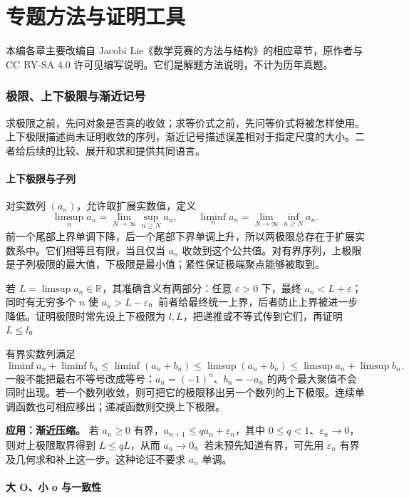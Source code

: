 \documentclass[UTF8,12pt,a4paper,fontset=fandol]{ctexart}
\begin{document}
\part{专题方法与证明工具}

本编各章主要改编自 Jacobi Lie《数学竞赛的方法与结构》的相应章节，原作者与 CC BY-SA 4.0 许可见编写说明。它们是解题方法说明，不计为历年真题。



\section{极限、上下极限与渐近记号}

求极限之前，先问对象是否真的收敛；求等价式之前，先问等价式将被怎样使用。上下极限描述尚未证明收敛的序列，渐近记号描述误差相对于指定尺度的大小。二者给后续的比较、展开和求和提供共同语言。

\subsection{上下极限与子列}

\label{app:limit-limsup}

对实数列 $(a_n)$，允许取扩展实数值，定义
\[
\limsup_na_n=\lim_{N\to\infty}\sup_{n\geq N}a_n,
\qquad
\liminf_na_n=\lim_{N\to\infty}\inf_{n\geq N}a_n.
\]
前一个尾部上界单调下降，后一个尾部下界单调上升，所以两极限总存在于扩展实数系中。它们相等且有限，当且仅当 $a_n$ 收敛到这个公共值。对有界序列，上极限是子列极限的最大值，下极限是最小值；紧性保证极端聚点能够被取到。

若 $L=\limsup a_n\in\mathbb R$，其准确含义有两部分：任意 $\varepsilon>0$ 下，最终 $a_n<L+\varepsilon$；同时有无穷多个 $n$ 使 $a_n>L-\varepsilon$。前者给最终统一上界，后者防止上界被进一步降低。证明极限时常先设上下极限为 $l,L$，把递推或不等式传到它们，再证明 $L\leq l$。

有界实数列满足
\[
\liminf a_n+\liminf b_n\leq\liminf(a_n+b_n)
\leq\limsup(a_n+b_n)\leq\limsup a_n+\limsup b_n.
\]
一般不能把最右不等号改成等号：$a_n=(-1)^n$、$b_n=-a_n$ 的两个最大聚值不会同时出现。若一个数列收敛，则可把它的极限移出另一个数列的上下极限。连续单调函数也可相应移出；递减函数则交换上下极限。

\textbf{应用：渐近压缩。} 若 $a_n\geq0$ 有界，$a_{n+1}\leq q a_n+\varepsilon_n$，其中 $0\leq q<1$、$\varepsilon_n\to0$，则对上极限取界得到 $L\leq qL$，从而 $a_n\to0$。若未预先知道有界，可先用 $\varepsilon_n$ 有界及几何求和补上这一步。这种论证不要求 $a_n$ 单调。

\subsection{大 O、小 o 与一致性}
\end{document}
